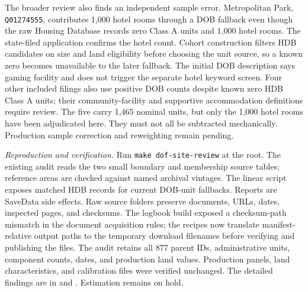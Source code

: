 The broader review also finds an independent sample error. Metropolitan Park,
\texttt{Q01274555}, contributes 1,000 hotel rooms through a DOB fallback even
though the raw Housing Database records zero Class A units and 1,000 hotel
rooms. The state-filed application confirms the hotel count. Cohort construction
filters HDB candidates on size and land eligibility before choosing the unit
source, so a known zero becomes unavailable to the later fallback. The initial
DOB description says gaming facility and does not trigger the separate hotel
keyword screen. Four other included filings also use positive DOB counts
despite known zero HDB Class A units; their community-facility and supportive
accommodation definitions require review. The five carry 1,465 nominal units,
but only the 1,000 hotel rooms have been adjudicated here. They must not all be
subtracted mechanically. Production sample correction and reweighting remain
pending.

\textit{Reproduction and verification.} Run \texttt{make dof-site-review} at
the root. The existing audit reads the two small boundary and membership source
tables; reference areas are checked against named archival vintages. The linear
 script exposes matched HDB records for current
DOB-unit fallbacks. Reports are SaveData side effects. Raw source folders
preserve documents, URLs, dates, inspected pages, and checksums. The logbook
build exposed a checksum-path mismatch in the document acquisition rules;
the recipes now translate manifest-relative output paths to the temporary
download filenames before verifying and publishing the files. The audit
retains all 877 parent IDs, administrative units, component counts, dates, and
production land values. Production panels, land characteristics, and calibration
files were verified unchanged. The detailed findings are in
 and
. Estimation remains on hold.
